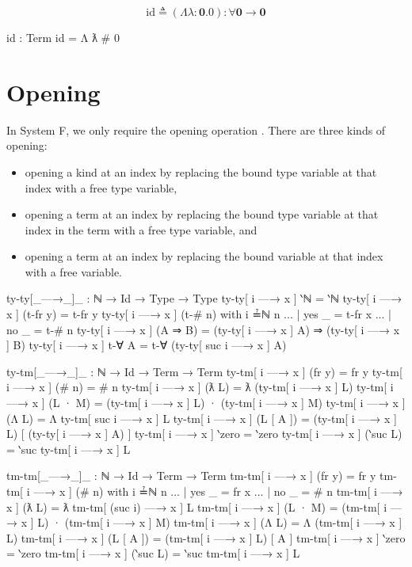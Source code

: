 \documentclass[logo,bsc,singlespacing,parskip,online]{infthesis}
\begin{document}
\begin{equation*}
  \text{id} \triangleq (\Lambda \lambda \colon \mathbf{0}. 0) \colon \forall \mathbf{0} \to \mathbf{0}
\end{equation*}
\begin{code}
  id : Term
  id = Λ ƛ # 0
\end{code}

\section{Opening}
In System F, we only require the opening operation \citep{chargueraud_locally_2012}. There are three
kinds of opening:
\begin{itemize}
  \item opening a kind at an index by replacing the bound type variable at that index with a free
        type variable,
  \item opening a term at an index by replacing the bound type variable at that index in the term
        with a free type variable, and
  \item opening a term at an index by replacing the bound variable at that index with a free
        variable.
\end{itemize}

\begin{code}
  ty-ty[_—→_]_ : ℕ → Id → Type → Type
  ty-ty[ i —→ x ] ‵ℕ = ‵ℕ
  ty-ty[ i —→ x ] (t-fr y) = t-fr y
  ty-ty[ i —→ x ] (t-# n) with i ≟ℕ n
  ... | yes _ = t-fr x
  ... | no  _ = t-# n
  ty-ty[ i —→ x ] (A ⇒ B) = (ty-ty[ i —→ x ] A) ⇒ (ty-ty[ i —→ x ] B)
  ty-ty[ i —→ x ] t-∀ A = t-∀ (ty-ty[ suc i —→ x ] A)

  ty-tm[_—→_]_ : ℕ → Id → Term → Term
  ty-tm[ i —→ x ] (fr y) = fr y
  ty-tm[ i —→ x ] (# n) = # n
  ty-tm[ i —→ x ] (ƛ L) = ƛ (ty-tm[ i —→ x ] L)
  ty-tm[ i —→ x ] (L · M) = (ty-tm[ i —→ x ] L) · (ty-tm[ i —→ x ] M)
  ty-tm[ i —→ x ] (Λ L) = Λ ty-tm[ suc i —→ x ] L
  ty-tm[ i —→ x ] (L [ A ]) = (ty-tm[ i —→ x ] L) [ (ty-ty[ i —→ x ] A) ]
  ty-tm[ i —→ x ] ‵zero = ‵zero
  ty-tm[ i —→ x ] (‵suc L) = ‵suc ty-tm[ i —→ x ] L

  tm-tm[_—→_]_ : ℕ → Id → Term → Term
  tm-tm[ i —→ x ] (fr y) = fr y
  tm-tm[ i —→ x ] (# n) with i ≟ℕ n
  ... | yes _ = fr x
  ... | no  _ = # n
  tm-tm[ i —→ x ] (ƛ L) = ƛ tm-tm[ (suc i) —→ x ] L
  tm-tm[ i —→ x ] (L · M) =
    (tm-tm[ i —→ x ] L) · (tm-tm[ i —→ x ] M)
  tm-tm[ i —→ x ] (Λ L) = Λ (tm-tm[ i —→ x ] L)
  tm-tm[ i —→ x ] (L [ A ]) = (tm-tm[ i —→ x ] L) [ A ]
  tm-tm[ i —→ x ] ‵zero = ‵zero
  tm-tm[ i —→ x ] (‵suc L) = ‵suc tm-tm[ i —→ x ] L
\end{code}
\end{document}
